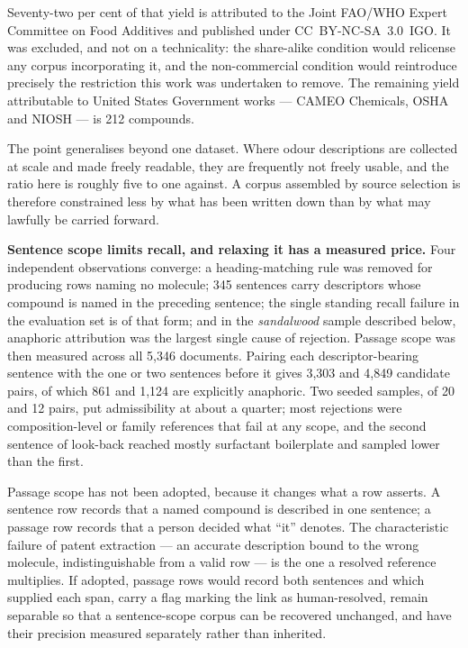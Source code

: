 \documentclass[
  computerscience
]{genesisl1-paper}
\begin{document}
Seventy-two per cent of that yield is attributed to the Joint FAO/WHO Expert Committee on
Food Additives and published under CC~BY-NC-SA~3.0~IGO. It was excluded, and not on a
technicality: the share-alike condition would relicense any corpus incorporating it, and
the non-commercial condition would reintroduce precisely the restriction this work was
undertaken to remove. The remaining yield attributable to United States Government works
--- CAMEO Chemicals, OSHA and NIOSH --- is 212 compounds.

The point generalises beyond one dataset. Where odour descriptions are collected at scale
and made freely readable, they are frequently not freely usable, and the ratio here is
roughly five to one against. A corpus assembled by source selection is therefore
constrained less by what has been written down than by what may lawfully be carried
forward.

\textbf{Sentence scope limits recall, and relaxing it has a measured price.} Four
independent observations converge: a heading-matching rule was removed for producing rows
naming no molecule; 345 sentences carry descriptors whose compound is named in the
preceding sentence; the single standing recall failure in the evaluation set is of that
form; and in the \emph{sandalwood} sample described below, anaphoric attribution was the
largest single cause of rejection. Passage scope was then measured across all 5{,}346
documents. Pairing each descriptor-bearing sentence with the one or two sentences before
it gives 3{,}303 and 4{,}849 candidate pairs, of which 861 and 1{,}124 are explicitly
anaphoric. Two seeded samples, of 20 and 12 pairs, put admissibility at about a quarter;
most rejections were composition-level or family references that fail at any scope, and
the second sentence of look-back reached mostly surfactant boilerplate and sampled lower
than the first.

Passage scope has not been adopted, because it changes what a row asserts. A sentence row
records that a named compound is described in one sentence; a passage row records that a
person decided what ``it'' denotes. The characteristic failure of patent extraction --- an
accurate description bound to the wrong molecule, indistinguishable from a valid row --- is
the one a resolved reference multiplies. If adopted, passage rows would record both
sentences and which supplied each span, carry a flag marking the link as human-resolved,
remain separable so that a sentence-scope corpus can be recovered unchanged, and have
their precision measured separately rather than inherited.
\end{document}
